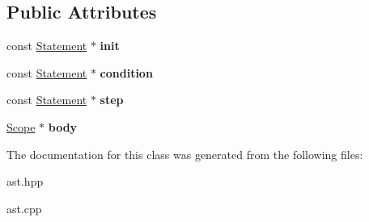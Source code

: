 \subsection*{Public Attributes}
\begin{DoxyCompactItemize}
\item 
\mbox{\label{class_for_statement_ac9e5f93a508f56a77e69c4245333f0ae}} 
const \hyperlink{class_statement}{Statement} $\ast$ {\bfseries init}
\item 
\mbox{\label{class_for_statement_ac5ec9bf9fee699436e8e41548e83855c}} 
const \hyperlink{class_statement}{Statement} $\ast$ {\bfseries condition}
\item 
\mbox{\label{class_for_statement_abf5f0ce2b90c9420eee55e14ec8edec5}} 
const \hyperlink{class_statement}{Statement} $\ast$ {\bfseries step}
\item 
\mbox{\label{class_for_statement_a5f9a886aa5ce770c6d5ecb0df1d7b191}} 
\hyperlink{class_scope}{Scope} $\ast$ {\bfseries body}
\end{DoxyCompactItemize}


The documentation for this class was generated from the following files\+:\begin{DoxyCompactItemize}
\item 
ast.\+hpp\item 
ast.\+cpp\end{DoxyCompactItemize}
